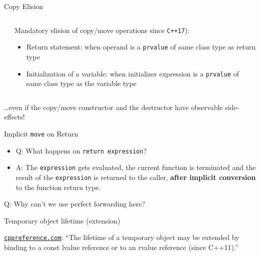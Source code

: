 \documentclass[compress,aspectratio=1610]{beamer}
\newcommand{\inputcpplisting}[1]{}
\begin{document}
\begin{frame}{Copy Elision}
    \begin{columns}
        \begin{column}{.45\textwidth}
            \inputcpplisting{snippet10}
        \end{column}
        \begin{column}{.5\textwidth}
            Mandatory elision of copy/move operations since \texttt{C++17}):
            \begin{itemize}
                \item Return statement: when operand is a \texttt{prvalue} of same class type as return type
                \item Initialization of a variable: when initializer expression is a \texttt{prvalue} of same class type as the variable type
            \end{itemize}
        \end{column}
    \end{columns}
    \ldots even if the copy/move constructor and the destructor have observable side-effects!
    \vspace{.5cm}

    \centering
\end{frame}

\begin{frame}{Implicit \texttt{move} on Return}
    \begin{itemize}
        \item Q: What happens on \texttt{return expression}?
        \item A: The \texttt{expression} gets evaluated, the current function is terminated and the result of the \texttt{expression} is returned to the caller, \textbf{after implicit conversion} to the function return type.
    \end{itemize}
\end{frame}

\begin{frame}[fragile]{Q: Why can't we use perfect forwarding here?}
    \inputcpplisting{snippet9}

\end{frame}

\begin{frame}[fragile]{Temporary object lifetime (extension)}
    \inputcpplisting{snippet22}

    \href{https://en.cppreference.com/w/cpp/language/lifetime}{\texttt{cppreference.com}}: \enquote{The lifetime of a temporary object may be extended by binding to a const lvalue reference or to an rvalue reference (since C++11).}
\end{frame}
\end{document}
